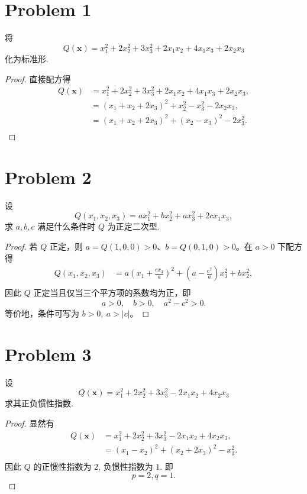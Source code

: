 \section*{Problem 1}

将
\[
Q\left(\boldsymbol{x}\right) = x_1^2 + 2x_2^2 + 3x_3^2 + 2x_1x_2 + 4x_1x_3 + 2x_2x_3
\]
化为标准形.

\begin{proof}
直接配方得
\[
\begin{aligned}
    Q\left(\boldsymbol{x}\right) &= x_1^2 + 2x_2^2 + 3x_3^2 + 2x_1x_2 + 4x_1x_3 + 2x_2x_3, \\
    &= \left(x_1 + x_2 + 2x_3\right)^2 + x_2^2 - x_3^2 - 2x_2x_3, \\
    &= \boxed{\left(x_1 + x_2 + 2x_3\right)^2 + \left(x_2 - x_3\right)^2 - 2x_3^2}. \\
\end{aligned}
\]

\end{proof}

\section*{Problem 2}

设
\[
Q\left(x_1, x_2, x_3\right) = ax_1^2 + bx_2^2 + ax_3^2 + 2cx_1x_3,
\]
求 $a, b, c$ 满足什么条件时 $Q$ 为正定二次型.

\begin{proof}
若 $Q$ 正定，则 $a=Q(1,0,0)>0$、$b=Q(0,1,0)>0$。在 $a>0$ 下配方得
\[
\begin{aligned}
    Q \left(x_1, x_2, x_3\right) &= a \left(x_1 + \frac{cx_3}{a}\right)^2 + \left(a - \frac{c^2}{a}\right)x_3^2 + bx_2^2, \\
\end{aligned}
\]
因此 $Q$ 正定当且仅当三个平方项的系数均为正，即
\[
\boxed{
    a > 0,\quad b > 0,\quad a^2 - c^2 > 0
}.
\]
等价地，条件可写为 $\boxed{b > 0,\ a > |c|}$。

\end{proof}
\section*{Problem 3}

设
\[
Q \left(\boldsymbol{x}\right) = x_1^2 + 2x_2^2 + 3x_3^2 - 2x_1x_2 + 4x_2x_3
\]
求其正负惯性指数.

\begin{proof}
显然有
\[
\begin{aligned}
    Q \left(\boldsymbol{x}\right) &= x_1^2 + 2x_2^2 + 3x_3^2 - 2x_1x_2 + 4x_2x_3, \\
    &= \left(x_1 - x_2\right)^2 + \left(x_2 + 2x_3\right)^2 - x_3^2. \\
\end{aligned}
\]
因此 $Q$ 的正惯性指数为 $2$, 负惯性指数为 $1$. 即
\[
\boxed{p = 2, q = 1}.
\]

\end{proof}

